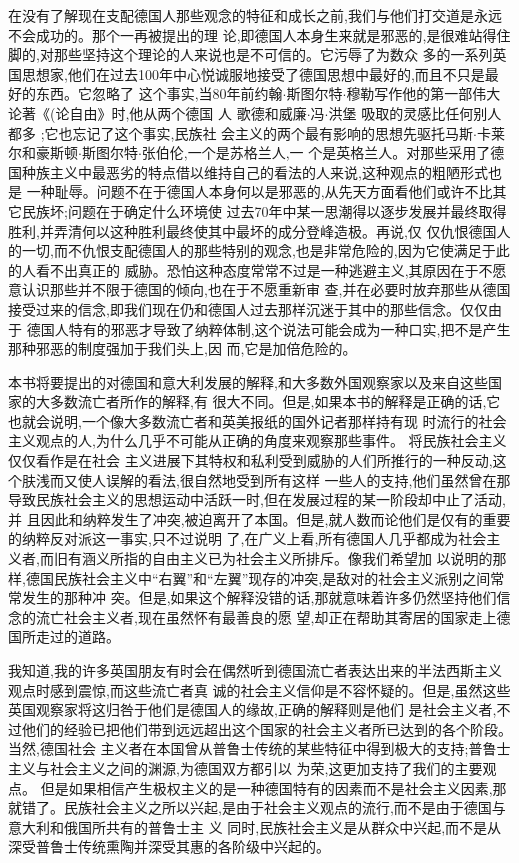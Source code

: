 ﻿\documentclass[12pt]{article}
\begin{document}
在没有了解现在支配德国人那些观念的特征和成长之前,我们与他们打交道是永远不会成功的。那个一再被提出的理
论,即德国人本身生来就是邪恶的,是很难站得住脚的,对那些坚持这个理论的人来说也是不可信的。它污辱了为数众
多的一系列英国思想家,他们在过去100年中心悦诚服地接受了德国思想中最好的,而且不只是最好的东西。它忽略了
这个事实,当80年前约翰$\cdot$斯图尔特$\cdot$穆勒写作他的第一部伟大论著《(论自由》时,他从两个德国
人 \myrule 歌德和威廉$\cdot$冯$\cdot$洪堡 \myrule 吸取的灵感比任何别人都多 ;它也忘记了这个事实,民族社
会主义的两个最有影响的思想先驱托马斯$\cdot$卡莱尔和豪斯顿$\cdot$斯图尔特$\cdot$张伯伦,一个是苏格兰人,一
个是英格兰人。对那些采用了德国种族主义中最恶劣的特点借以维持自己的看法的人来说,这种观点的粗陋形式也是
一种耻辱。问题不在于德国人本身何以是邪恶的,从先天方面看他们或许不比其它民族坏;问题在于确定什么环境使
过去70年中某一思潮得以逐步发展并最终取得胜利,并弄清何以这种胜利最终使其中最坏的成分登峰造极。再说,仅
仅仇恨德国人的一切,而不仇恨支配德国人的那些特别的观念,也是非常危险的,因为它使满足于此的人看不出真正的
威胁。恐怕这种态度常常不过是一种逃避主义,其原因在于不愿意认识那些并不限于德国的倾向,也在于不愿重新审
查,并在必要时放弃那些从德国接受过来的信念,即我们现在仍和德国人过去那样沉迷于其中的那些信念。仅仅由于
德国人特有的邪恶才导致了纳粹体制,这个说法可能会成为一种口实,把不是产生那种邪恶的制度强加于我们头上,因
而,它是加倍危险的。

本书将要提出的对德国和意大利发展的解释,和大多数外国观察家以及来自这些国家的大多数流亡者所作的解释,有
很大不同。但是,如果本书的解释是正确的话,它也就会说明,一个像大多数流亡者和英美报纸的国外记者那样持有现
时流行的社会主义观点的人,为什么几乎不可能从正确的角度来观察那些事件。 将民族社会主义仅仅看作是在社会
主义进展下其特权和私利受到威胁的人们所推行的一种反动,这个肤浅而又使人误解的看法,很自然地受到所有这样
一些人的支持,他们虽然曾在那导致民族社会主义的思想运动中活跃一时,但在发展过程的某一阶段却中止了活动,并
且因此和纳粹发生了冲突,被迫离开了本国。但是,就人数而论他们是仅有的重要的纳粹反对派这一事实,只不过说明
了,在广义上看,所有德国人几乎都成为社会主义者,而旧有涵义所指的自由主义已为社会主义所排斥。像我们希望加
以说明的那样,德国民族社会主义中``右翼''和``左翼''现存的冲突,是敌对的社会主义派别之间常常发生的那种冲
突。但是,如果这个解释没错的话,那就意味着许多仍然坚持他们信念的流亡社会主义者,现在虽然怀有最善良的愿
望,却正在帮助其寄居的国家走上德国所走过的道路。

我知道,我的许多英国朋友有时会在偶然听到德国流亡者表达出来的半法西斯主义观点时感到震惊,而这些流亡者真
诚的社会主义信仰是不容怀疑的。但是,虽然这些英国观察家将这归咎于他们是德国人的缘故,正确的解释则是他们
是社会主义者,不过他们的经验已把他们带到远远超出这个国家的社会主义者所已达到的各个阶段。当然,德国社会
主义者在本国曾从普鲁士传统的某些特征中得到极大的支持;普鲁士主义与社会主义之间的渊源,为德国双方都引以
为荣,这更加支持了我们的主要观点。 但是如果相信产生极权主义的是一种德国特有的因素而不是社会主义因素,那
就错了。民族社会主义之所以兴起,是由于社会主义观点的流行,而不是由于德国与意大利和俄国所共有的普鲁士主
义 \myrule 同时,民族社会主义是从群众中兴起,而不是从深受普鲁士传统熏陶并深受其惠的各阶级中兴起的。
\end{document}
